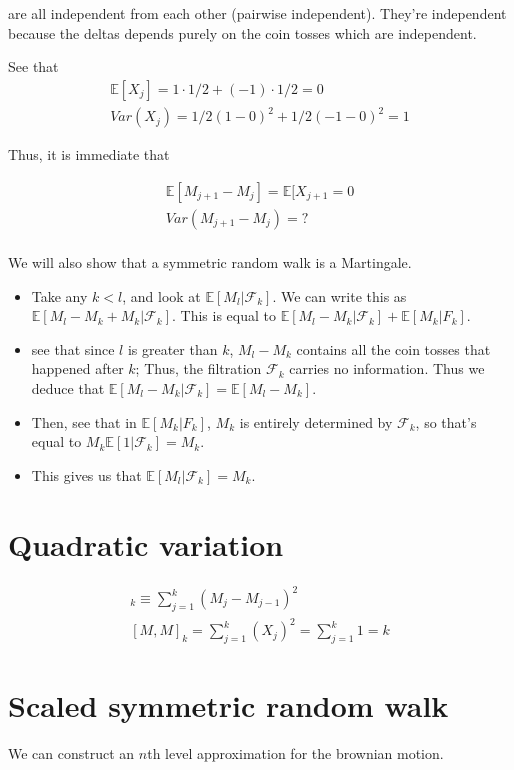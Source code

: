 \documentclass{book}
\newcommand{\F}{\ensuremath{\mathcal{F}}}
\newcommand{\E}{\ensuremath{\mathbb{E}}}
\theoremstyle{definition}
\begin{document}
are all independent from each other (pairwise independent). They're independent
because the deltas depends purely on the coin tosses which are independent.

See that 
\begin{align*}
\E[X_j] = 1\cdot 1/2 + (-1) \cdot 1/2 = 0 \\
Var(X_j) = 1/2(1-0)^2 + 1/2(-1 - 0)^2 = 1
\end{align*}

Thus, it is immediate that 

\begin{align*}
\E[M_{j+1} - M_j] = \E[X_{j+1} = 0 \\
Var(M_{j+1} - M_j) = ? \\
\end{align*}

We will also show that a symmetric random walk is a Martingale.

\begin{itemize}
\item Take any $k < l$, and look at $\E[M_l | \F_k]$. We can write this as
$\E[M_l - M_k + M_k | \F_k]$.  This is equal to $\E[M_l - M_k| \F_k] +
\E[M_k|F_k]$.           
\item see that since $l$ is greater than $k$, $M_l - M_k$ contains all the coin tosses that happened
after $k$; Thus, the filtration $\F_k$ carries no information. Thus we deduce that
$\E[M_l - M_k|\F_k] = \E[M_l - M_k]$. 
\item Then, see that in $\E[M_k|F_k]$, $M_k$ is entirely determined by $\F_k$, so
  that's equal to $M_k \E[1 | \F_k] = M_k$.
\item This gives us that $\E[M_l|\F_k] = M_k$.
\end{itemize}

\section{Quadratic variation}

\begin{align*}
[M, M]_k \equiv \sum_{j=1}^k (M_j - M_{j-1})^2  \\
[M, M]_k = \sum_{j=1}^k (X_j)^2 = \sum_{j=1}^k 1 = k
\end{align*}


\section{Scaled symmetric random walk}

We can construct an $n$th level approximation for the brownian motion.
\end{document}
